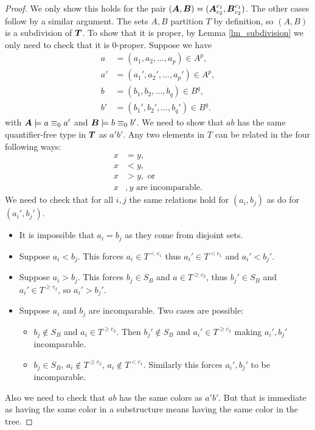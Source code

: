 \documentclass{amsart}
\DeclareMathOperator{\TT}{\boldface T}
\DeclareMathOperator{\AT}{\boldface A}
\DeclareMathOperator{\BT}{\boldface B}
\begin{document}
\begin{proof}
  We only show this holds for the pair $(\AT, \BT) = (\AT^{c_1}_{c_2} ,\BT^{c_1}_{c_2})$.
  The other cases follow by a similar argument.
  The sets $A,B$ partition $T$ by definition, so $(A,B)$ is a subdivision of $\TT$.
  To show that it is proper, by Lemma \ref{lm_subdivision} we only need to check that it is $0$-proper. Suppose we have
  \begin{align*}
    a &= (a_1, a_2, \ldots, a_p) \in A^p, \\
    a' &= (a_1', a_2', \ldots, a_p') \in A^p,  \\
    b &= (b_1, b_2, \ldots, b_q) \in B^q,  \\
    b' &= (b_1', b_2', \ldots, b_q') \in B^q. 
  \end{align*}
  with $\AT \models a \equiv_0 a'$ and $\BT \models b \equiv_0 b'$.
  We need to show that $ab$ has the same quantifier-free type in $\TT$ as $a'b'$.
  Any two elements in $T$ can be related in the four following ways:
  \begin{align*}
    x &= y, \\
    x &< y, \\
    x &> y, \text{ or } \\
    x&,y \text{ are incomparable.}
  \end{align*}
  We need to check that  for all $i,j$ the same relations hold for $(a_i, b_j)$ as do for $(a_i', b_j')$.
  
  \begin{itemize}
  \item It is impossible that $a_i = b_j$ as they come from disjoint sets.
  \item Suppose $a_i < b_j$. This forces $a_i \in T^{<c_1}$ thus $a_i' \in T^{<c_1}$ and $a_i' < b_j'$.
  \item Suppose $a_i > b_j$. This forces $b_j \in S_B$ and $a \in T^{\geq c_2}$, thus $b_j' \in S_B$ and $a_i' \in T^{\geq c_2}$, so $a_i' > b_j'$.
  \item Suppose $a_i$ and $b_j$ are incomparable. Two cases are possible:
    \begin{itemize}
    \item $b_j \notin S_B$ and $a_i \in T^{\geq c_2}$. Then $b_j' \notin S_B$ and $a_i' \in T^{\geq c_2}$ making $a_i', b_j'$ incomparable.
    \item $b_j \in S_B$, $a_i \notin T^{\geq c_2}$, $a_i \notin T^{<c_1}$. Similarly this forces $a_i', b_j'$ to be incomparable.
    \end{itemize}
  \end{itemize}
  Also we need to check that $ab$ has the same colors as $a'b'$. But that is immediate as having the same color in a substructure means having the same color in the tree.
\end{proof}
\end{document}
